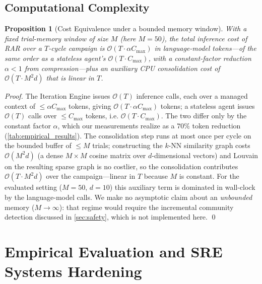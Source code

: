 \documentclass[conference]{IEEEtran}
\newtheorem{proposition}{Proposition}
\newcommand{\Cmax}{C_{\max}}
\begin{document}
\subsection{Computational Complexity}
\label{sec:complexity}

\begin{proposition}[Cost Equivalence under a bounded memory window]
  \label{prop:complexity}
  With a fixed trial-memory window of size $M$ (here $M{=}50$), the total inference cost of RAR over a $T$-cycle campaign is $\mathcal{O}(T{\cdot}\alpha\Cmax)$ in language-model tokens---of the same order as a stateless agent's $\mathcal{O}(T{\cdot}\Cmax)$, with a constant-factor reduction $\alpha<1$ from compression---plus an auxiliary CPU consolidation cost of $\mathcal{O}(T{\cdot}M^2 d)$ that is \emph{linear} in $T$.
\end{proposition}

\begin{proof}
  The Iteration Engine issues $\mathcal{O}(T)$ inference calls, each over a managed context of $\leq \alpha\Cmax$ tokens, giving $\mathcal{O}(T{\cdot}\alpha\Cmax)$ tokens; a stateless agent issues $\mathcal{O}(T)$ calls over $\leq \Cmax$ tokens, i.e. $\mathcal{O}(T{\cdot}\Cmax)$. The two differ only by the constant factor $\alpha$, which our measurements realize as a $70\%$ token reduction (\cref{tab:empirical_results}). The consolidation step runs at most once per cycle on the bounded buffer of $\leq M$ trials; constructing the $k$-NN similarity graph costs $\mathcal{O}(M^2 d)$ (a dense $M\times M$ cosine matrix over $d$-dimensional vectors) and Louvain on the resulting sparse graph is no costlier, so the consolidation contributes $\mathcal{O}(T{\cdot}M^2 d)$ over the campaign---linear in $T$ because $M$ is constant. For the evaluated setting ($M{=}50$, $d{=}10$) this auxiliary term is dominated in wall-clock by the language-model calls. We make no asymptotic claim about an \emph{unbounded} memory ($M\!\to\!\infty$): that regime would require the incremental community detection discussed in \cref{sec:safety}, which is not implemented here. \qed
\end{proof}
\section{Empirical Evaluation and SRE Systems Hardening}
\label{sec:experiments}
\end{document}
